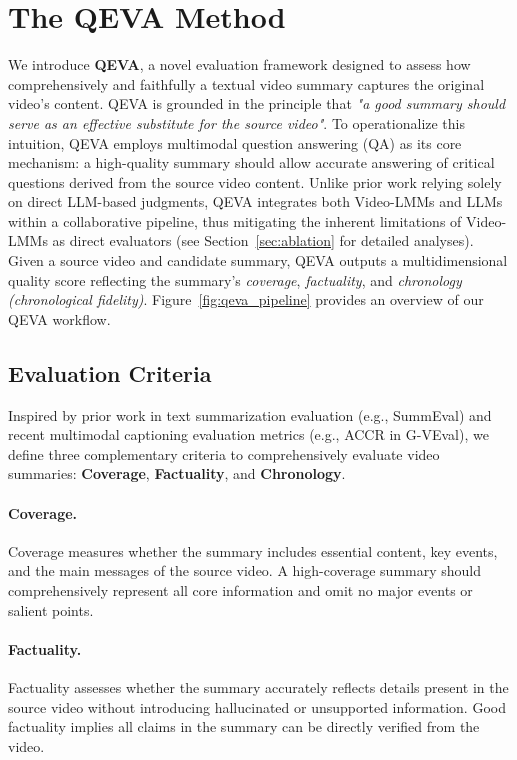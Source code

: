 \section{The QEVA Method}
\label{sec:method}

We introduce \textbf{QEVA}, a novel evaluation framework designed to assess how comprehensively and faithfully a textual video summary captures the original video's content. QEVA is grounded in the principle that \textit{"a good summary should serve as an effective substitute for the source video"}. To operationalize this intuition, QEVA employs multimodal question answering (QA) as its core mechanism: a high-quality summary should allow accurate answering of critical questions derived from the source video content. Unlike prior work relying solely on direct LLM-based judgments, QEVA integrates both Video-LMMs and LLMs within a collaborative pipeline, thus mitigating the inherent limitations of Video-LMMs as direct evaluators (see Section~\ref{sec:ablation} for detailed analyses). Given a source video and candidate summary, QEVA outputs a multidimensional quality score reflecting the summary's \textit{coverage}, \textit{factuality}, and \textit{chronology (chronological fidelity)}. Figure~\ref{fig:qeva_pipeline} provides an overview of our QEVA workflow.

\subsection{Evaluation Criteria}
Inspired by prior work in text summarization evaluation (e.g., SummEval) and recent multimodal captioning evaluation metrics (e.g., ACCR in G-VEval), we define three complementary criteria to comprehensively evaluate video summaries: \textbf{Coverage}, \textbf{Factuality}, and \textbf{Chronology}.

\paragraph{Coverage.}
Coverage measures whether the summary includes essential content, key events, and the main messages of the source video. A high-coverage summary should comprehensively represent all core information and omit no major events or salient points.

\paragraph{Factuality.}
Factuality assesses whether the summary accurately reflects details present in the source video without introducing hallucinated or unsupported information. Good factuality implies all claims in the summary can be directly verified from the video.

